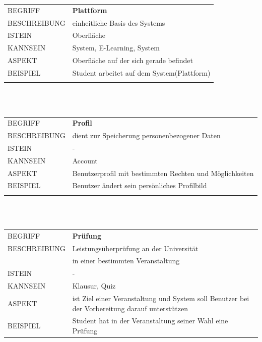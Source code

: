 \documentclass[12pt,a4paper]{article}
\begin{document}
\begin{tabular}{l p{12cm}}
BEGRIFF 	 & \textbf{Plattform} \\ 
BESCHREIBUNG & einheitliche Basis des Systems\\ 
ISTEIN   	 & Oberfläche\\
KANNSEIN 	 & System, E-Learning, System \\ 
ASPEKT   	 & Oberfläche auf der sich gerade befindet\\
BEISPIEL 	 & Student arbeitet auf dem System(Plattform)\\\\
\hline
\end{tabular}\\\\  

\begin{tabular}{l p{12cm}}
BEGRIFF 	 & \textbf{Profil} \\ 
BESCHREIBUNG & dient zur Speicherung personenbezogener Daten \\ 
ISTEIN   	 & - \\
KANNSEIN 	 & Account\\ 
ASPEKT   	 & Benutzerprofil mit bestimmten Rechten und Möglichkeiten\\
BEISPIEL 	 & Benutzer ändert sein persönliches Profilbild\\\\
\hline
\end{tabular}\\\\  

\begin{tabular}{l p{12cm}}
BEGRIFF 	 & \textbf{Prüfung} \\ 
BESCHREIBUNG & Leistungsüberprüfung an der Universität\\
			 & in einer bestimmten Veranstaltung\\ 
ISTEIN   	 & - \\
KANNSEIN 	 & Klausur, Quiz\\ 
ASPEKT   	 & ist Ziel einer Veranstaltung und System soll Benutzer bei der Vorbereitung darauf unterstützen\\
BEISPIEL 	 & Student hat in der Veranstaltung seiner Wahl eine Prüfung\\
\hline
\end{tabular}\\\\  
\end{document}
